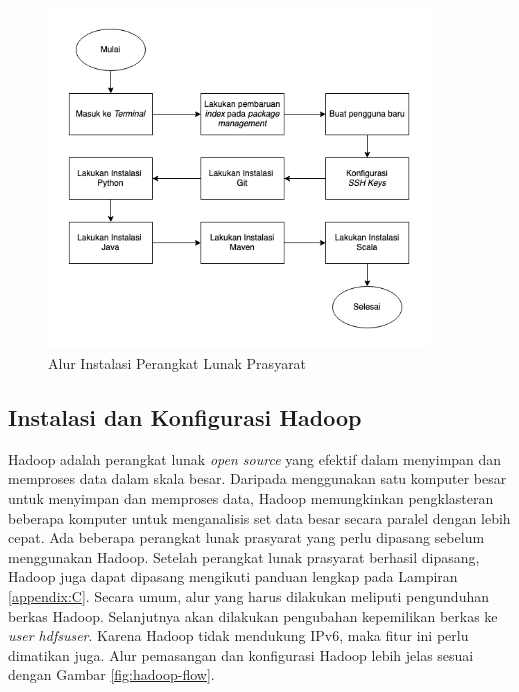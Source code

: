 \begin{figure}[h!]
    \centering
    \includegraphics[width=0.9\textwidth]{figures/ch03/prasayarat-flow.png}
    \caption{Alur Instalasi Perangkat Lunak Prasyarat}
    \label{fig:prasyarat-flow}
\end{figure}

\subsection{Instalasi dan Konfigurasi Hadoop}
Hadoop adalah perangkat lunak \textit{open source} yang efektif dalam menyimpan dan memproses data dalam skala besar. Daripada menggunakan satu komputer besar untuk menyimpan dan memproses data, Hadoop memungkinkan pengklasteran beberapa komputer untuk menganalisis set data besar secara paralel dengan lebih cepat. Ada beberapa perangkat lunak prasyarat yang perlu dipasang sebelum menggunakan Hadoop. Setelah perangkat lunak prasyarat berhasil dipasang, Hadoop juga dapat dipasang mengikuti panduan lengkap pada Lampiran \ref{appendix:C}. 
Secara umum, alur yang harus dilakukan meliputi pengunduhan berkas Hadoop. Selanjutnya akan dilakukan pengubahan kepemilikan berkas ke \textit{user hdfsuser}. Karena Hadoop tidak mendukung IPv6, maka fitur ini perlu dimatikan juga. Alur pemasangan dan konfigurasi Hadoop lebih jelas sesuai dengan Gambar \ref{fig:hadoop-flow}.

